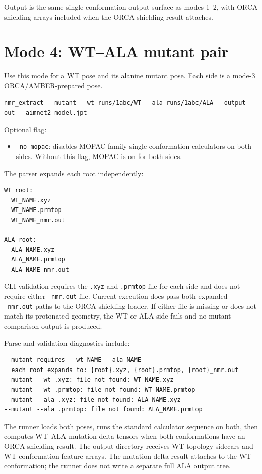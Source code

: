 \documentclass[11pt]{article}
\begin{document}
Output is the same single-conformation output surface as modes 1--2, with ORCA
shielding arrays included when the ORCA shielding result attaches.

\section{Mode 4: WT--ALA mutant pair}

Use this mode for a WT pose and its alanine mutant pose. Each side is a mode-3
ORCA/AMBER-prepared pose.

\begin{lstlisting}
nmr_extract --mutant --wt runs/1abc/WT --ala runs/1abc/ALA --output out --aimnet2 model.jpt
\end{lstlisting}

Optional flag:

\begin{itemize}
\item \texttt{--no-mopac}: disables MOPAC-family single-conformation
  calculators on both sides. Without this flag, MOPAC is on for both sides.
\end{itemize}

The parser expands each root independently:

\begin{lstlisting}
WT root:
  WT_NAME.xyz
  WT_NAME.prmtop
  WT_NAME_nmr.out

ALA root:
  ALA_NAME.xyz
  ALA_NAME.prmtop
  ALA_NAME_nmr.out
\end{lstlisting}

CLI validation requires the \texttt{.xyz} and \texttt{.prmtop} file for each
side and does not require either \texttt{\_nmr.out} file. Current execution
does pass both expanded \texttt{\_nmr.out} paths to the ORCA shielding loader.
If either file is missing or does not match its protonated geometry, the WT or
ALA side fails and no mutant comparison output is produced.

Parse and validation diagnostics include:

\begin{lstlisting}
--mutant requires --wt NAME --ala NAME
  each root expands to: {root}.xyz, {root}.prmtop, {root}_nmr.out
--mutant --wt .xyz: file not found: WT_NAME.xyz
--mutant --wt .prmtop: file not found: WT_NAME.prmtop
--mutant --ala .xyz: file not found: ALA_NAME.xyz
--mutant --ala .prmtop: file not found: ALA_NAME.prmtop
\end{lstlisting}

The runner loads both poses, runs the standard calculator sequence on both,
then computes WT--ALA mutation delta tensors when both conformations have an
ORCA shielding result. The output directory receives WT topology sidecars and
WT conformation feature arrays. The mutation delta result attaches to the WT
conformation; the runner does not write a separate full ALA output tree.
\end{document}

